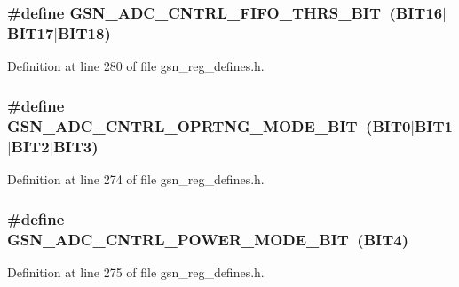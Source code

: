 \hypertarget{a00546_a457c6a45703f9e10f3babba23fc5dd51}{
\subsubsection[{GSN\_\-ADC\_\-CNTRL\_\-FIFO\_\-THRS\_\-BIT}]{\setlength{\rightskip}{0pt plus 5cm}\#define GSN\_\-ADC\_\-CNTRL\_\-FIFO\_\-THRS\_\-BIT~(BIT16$|$BIT17$|$BIT18)}}
\label{a00546_a457c6a45703f9e10f3babba23fc5dd51}


Definition at line 280 of file gsn\_\-reg\_\-defines.h.

\hypertarget{a00546_a6a6222308a1c12f65f8f46889f913f22}{
\subsubsection[{GSN\_\-ADC\_\-CNTRL\_\-OPRTNG\_\-MODE\_\-BIT}]{\setlength{\rightskip}{0pt plus 5cm}\#define GSN\_\-ADC\_\-CNTRL\_\-OPRTNG\_\-MODE\_\-BIT~(BIT0$|$BIT1$|$BIT2$|$BIT3)}}
\label{a00546_a6a6222308a1c12f65f8f46889f913f22}


Definition at line 274 of file gsn\_\-reg\_\-defines.h.

\hypertarget{a00546_a2cf796a94684c64e71ede0c414b047ed}{
\subsubsection[{GSN\_\-ADC\_\-CNTRL\_\-POWER\_\-MODE\_\-BIT}]{\setlength{\rightskip}{0pt plus 5cm}\#define GSN\_\-ADC\_\-CNTRL\_\-POWER\_\-MODE\_\-BIT~(BIT4)}}
\label{a00546_a2cf796a94684c64e71ede0c414b047ed}


Definition at line 275 of file gsn\_\-reg\_\-defines.h.

